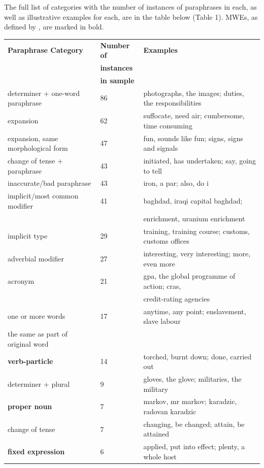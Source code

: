 \documentclass[11pt]{article}
\begin{document}
\begin{itemize}
The full list of categories with the number of instances of paraphrases in each, as well as illustrative examples for each, are in the table below (Table 1). MWEs, as defined by , are marked in bold. 


\begin{center}
\begin{table}
\hfill{}
\begin{tabular}{|l|l|l|}
\hline
\bf Paraphrase Category & \bf Number of & \bf Examples \\ 
 & \bf instances & \\
 & \bf in sample & \\ 
\hline
determiner + one-word paraphrase & 86 & photographs, the images; duties, the responsibilities \\
expansion & 62 & suffocate, need air; cumbersome, time consuming \\
expansion, same morphological form & 47 & fun, sounds like fun; signs, signs and signals \\
change of tense + paraphrase & 43 & initiated, has undertaken; say, going to tell \\
inaccurate/bad paraphrase & 43 & iron, a par; also, do i\\
implicit/most common modifier & 41 & baghdad, iraqi capital baghdad; \\
&& enrichment, uranium enrichment \\
implicit type & 29 & training, training course; customs, customs offices \\
adverbial modifier& 27 & interesting, very interesting; more, even more \\
acronym & 21 & gpa, the global programme of action; cras, \\
&& credit-rating agencies \\
one or more words  & 17 &  anytime, any point; enslavement, slave labour \\
the same as part of original word & &\\
\bf verb-particle & 14  & torched, burnt down; done, carried out\\
determiner + plural & 9 & gloves, the glove; militaries, the military\\
\bf proper noun & 7 & markov, mr markov; karadzic, radovan karadzic\\
change of tense & 7 & changing, be changed; attain, be attained\\
\bf fixed expression & 6 & applied, put into effect; plenty, a whole host \\

\end{tabular}
\end{table}
\end{center}
\end{itemize}
\end{document}
